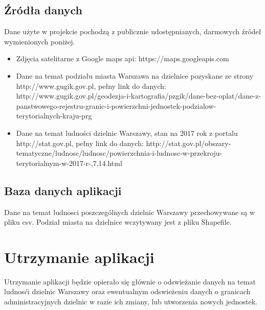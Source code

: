 \documentclass[a4paper,12p]{article}
\begin{document}
	\subsection{Źródła danych}
		Dane użyte w projekcie pochodzą z publicznie udostępnianych, darmowych źródeł wymienionych poniżej.
	
	\begin{itemize}
	\item Zdjęcia satelitarne z Google maps api: https://maps.googleapis.com
	\item Dane na temat podziału miasta Warszawa na dzielnice pozyskane ze strony http://www.gugik.gov.pl, pełny link do danych: http://www.gugik.gov.pl/geodezja-i-kartografia/pzgik/dane-bez-oplat/dane-z-panstwowego-rejestru-granic-i-powierzchni-jednostek-podzialow-terytorialnych-kraju-prg
	\item Dane na temat ludności dzielnic Warszawy, stan na 2017 rok z portalu http://stat.gov.pl, pełny link do danych: http://stat.gov.pl/obszary-tematyczne/ludnosc/ludnosc/powierzchnia-i-ludnosc-w-przekroju-terytorialnym-w-2017-r-,7,14.html
	\end{itemize}

	\subsection{Baza danych aplikacji}
	Dane na temat ludnosci poszczególnych dzielnic Warszawy przechowywane są w pliku csv. Podział miasta na dzielnice wczytywany jest z pliku Shapefile.

	\section{Utrzymanie aplikacji}
		Utrzymanie aplikacji będzie opierało się głównie o odswieżanie danych na temat ludnosći dzielnic Warszawy oraz ewentualnym odswieżeniu danych o granicach administracyjnych dzielnic w razie ich zmiany, lub utworzenia nowych jednostek.
\end{document}
